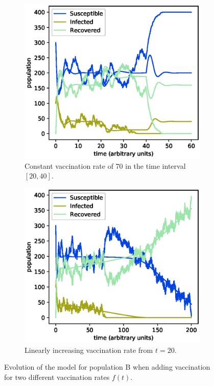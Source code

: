 \documentclass[a4paper,10pt,twocolumn]{article}
\begin{document}
\begin{figure}
	\centering
\begin{subfigure}{0.5\linewidth}
	\centering
	\includegraphics[width=\linewidth]{Bf70i2040_1.eps}
	\caption{Constant vaccination rate of 70 in the time interval $[20,40]$.}
	\label{fig:ecamp}
\end{subfigure}%
\begin{subfigure}{0.5\linewidth}
	\centering
	\includegraphics[width=\linewidth]{Bf1ti20inf_1.eps}
	\caption{Linearly increasing vaccination rate from $t=20$.}
	\label{fig:einc}
\end{subfigure}
	\caption{Evolution of the  model for population B when adding vaccination for two different vaccination rates $f(t)$.}
	\label{fig:e}
\end{figure}
\end{document}

